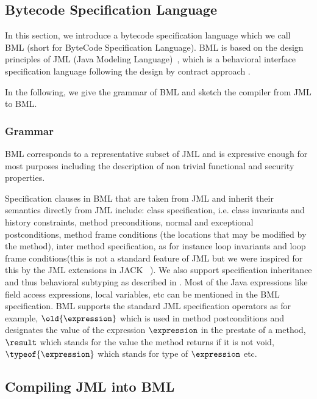 \subsection{Bytecode Specification Language}\label{bcSpecLg}

In this section, we introduce a bytecode specification language which we call BML (short for ByteCode Specification Language).
 BML is based on the design principles of JML (Java Modeling Language)~\cite{JMLRefMan}, which is a behavioral interface specification 
language following the design by contract approach \cite{M97oos}.

In the following, we give the grammar of BML and sketch the compiler from JML to BML. 

\subsubsection{Grammar} \label{grammar}


BML corresponds to a representative subset of JML and is expressive enough for most purposes including the description of non trivial functional and security properties.


 Specification clauses in BML that are taken from JML and inherit their semantics directly from JML include:
class specification, i.e. class invariants and history constraints, 
  method preconditions, normal and exceptional postconditions, method frame conditions (the locations that may be modified by the method), inter method specification, as for instance loop invariants and loop frame conditions(this is not a standard feature of JML but we were inspired for this by the JML extensions in JACK ~\cite{BRL-JACK}). 
We also support specification inheritance and thus behavioral subtyping as described in \cite{Dhara-Leavens96}. Most of the Java expressions like field access expressions, local variables, etc can be mentioned in the BML specification.
BML supports the standard JML specification operators as for example, $\old{\expression}$ which is used in method postconditions and
 designates the value of the expression $\expression$ in the prestate of a method, $ \result$ which stands for the value the method
returns if it is not void,  $\typeof{\expression}$ which stands for type of $\expression$ etc.  

\subsection{Compiling JML into BML}\label{comJML}


